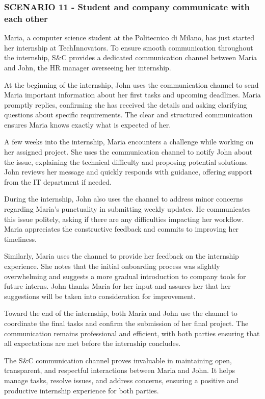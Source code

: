 \subsubsection{SCENARIO 11 - Student and company communicate with each other}
Maria, a computer science student at the Politecnico di Milano, has just started her internship at
TechInnovators. To ensure smooth communication throughout the internship, S\&C provides a dedicated
communication channel between Maria and John, the HR manager overseeing her internship.  

At the beginning of the internship, John uses the communication channel to send Maria important
information about her first tasks and upcoming deadlines. Maria promptly replies, confirming
she has received the details and asking clarifying questions about specific requirements.
The clear and structured communication ensures Maria knows exactly what is expected of her.  

A few weeks into the internship, Maria encounters a challenge while working on her assigned project.
She uses the communication channel to notify John about the issue, explaining the technical difficulty
and proposing potential solutions. John reviews her message and quickly responds with guidance,
offering support from the IT department if needed.  

During the internship, John also uses the channel to address minor concerns regarding
Maria’s punctuality in submitting weekly updates. He communicates this issue politely,
asking if there are any difficulties impacting her workflow. Maria appreciates the constructive
feedback and commits to improving her timeliness.  

Similarly, Maria uses the channel to provide her feedback on the internship experience.
She notes that the initial onboarding process was slightly overwhelming and suggests a more
gradual introduction to company tools for future interns. John thanks Maria for her input and
assures her that her suggestions will be taken into consideration for improvement.  

Toward the end of the internship, both Maria and John use the channel to coordinate the final
tasks and confirm the submission of her final project. The communication remains professional
and efficient, with both parties ensuring that all expectations are met before the internship
concludes.  

The S\&C communication channel proves invaluable in maintaining open, transparent, and respectful
interactions between Maria and John. It helps manage tasks, resolve issues, and address concerns,
ensuring a positive and productive internship experience for both parties.

